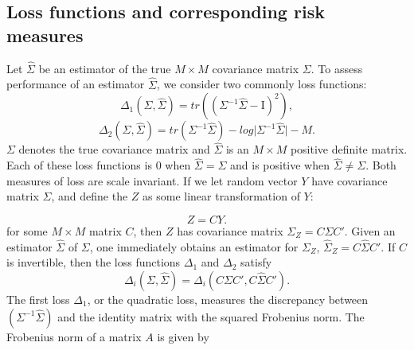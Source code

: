 \bigskip

%


\subsection{Loss functions and corresponding risk measures}
Let $\hat{\Sigma}$ be an estimator of the true $M \times M$ covariance matrix $\Sigma$. To assess performance of an estimator $\hat{\Sigma}$, we consider two commonly loss functions:
\begin{equation} \label{eq:quad-loss}
\Delta_1\left(\Sigma,\hat{\Sigma} \right) = tr\left(\left( \Sigma^{-1} \hat{\Sigma} - \mathrm{I}\right)^2 \right),
\end{equation}
\noindent
\begin{equation} \label{eq:entropy-loss}
\Delta_2\left(\Sigma,\hat{\Sigma}\right) = tr\left( \Sigma^{-1} \hat{\Sigma} \right) - log \vert \Sigma^{-1} \hat{\Sigma} \vert - M.
\end{equation}
\noindent
$\Sigma$ denotes the true covariance matrix and $\hat{\Sigma}$ is an $M \times M$ positive definite matrix. Each of these loss functions is $0$ when $\hat{\Sigma} = \Sigma$ and is positive when $\hat{\Sigma} \ne \Sigma$. Both measures of loss are scale invariant. If we let random vector $Y$ have covariance matrix $\Sigma$, and define the $Z$ as some linear transformation of $Y$:

\[
Z = CY. 
\]
\noindent
for some $M \times M$ matrix $C$,  then $Z$ has covariance matrix $\Sigma_Z = C \Sigma C'$. Given an estimator $\hat{\Sigma}$ of $\Sigma$, one immediately obtains an estimator for $\Sigma_Z$, $\hat{\Sigma}_Z = C \hat{\Sigma} C'$. If $C$ is invertible, then the loss functions $\Delta_1$ and $\Delta_2$ satisfy
\[
\Delta_i\left(\Sigma,\hat{\Sigma}\right) = \Delta_i\left(C \Sigma C', C \hat{\Sigma}C' \right). 
\]
\noindent
The first loss $\Delta_1$, or the quadratic loss, measures the discrepancy between $\left(\Sigma^{-1} \hat{\Sigma}\right)$ and the identity matrix with the squared Frobenius norm. The Frobenius norm of a matrix $A$ is given by 

